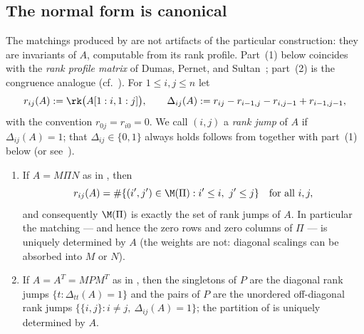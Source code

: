 \subsection{The normal form is canonical}

The matchings produced by
 are not artifacts of the
particular construction: they are invariants of $A$, computable from its
rank profile.  Part~(1) below coincides with the \emph{rank profile matrix}
of Dumas, Pernet, and Sultan~\cite{dumas_pernet_sultan_2017}; part~(2) is
the congruence analogue (cf.~\cite{bagno_cherniavsky_2012,szechtman_2007}).
For $1 \le i, j \le n$ let
\[
  r_{ij}(A) := \rk\bigl(A[1:i,1:j]\bigr),
  \qquad
  \Delta_{ij}(A) := r_{ij} - r_{i-1,j} - r_{i,j-1} + r_{i-1,j-1},
\]
with the convention $r_{0j} = r_{i0} = 0$.  We call $(i,j)$ a
\emph{rank jump} of $A$ if $\Delta_{ij}(A) = 1$; that
$\Delta_{ij} \in \{0,1\}$ always holds follows from
 together with part~(1) below (or
see~\cite{dumas_pernet_sultan_2017}).

\begin{proposition}[canonicity]\label{prop:canonical}
  \begin{enumerate}
    \item If $A = M \Pi N$ as in , then
      \[
        r_{ij}(A) = \#\{(i',j') \in \M(\Pi) : i' \le i,\ j' \le j\}
        \quad \text{for all } i, j,
      \]
      and consequently $\M(\Pi)$ is exactly the set of rank jumps of $A$.
      In particular the matching --- and hence the zero rows and zero
      columns of $\Pi$ --- is uniquely determined by $A$ (the weights are
      not: diagonal scalings can be absorbed into $M$ or $N$).
    \item If $A = A^T = M P M^T$ as in , then the
      singletons of $P$ are the diagonal rank jumps $\{t :
      \Delta_{tt}(A) = 1\}$ and the pairs of $P$ are the unordered
      off-diagonal rank jumps $\{\{i,j\} : i \neq j,\ \Delta_{ij}(A) = 1\}$;
      the partition of  is uniquely determined by
      $A$.
  \end{enumerate}
\end{proposition}

